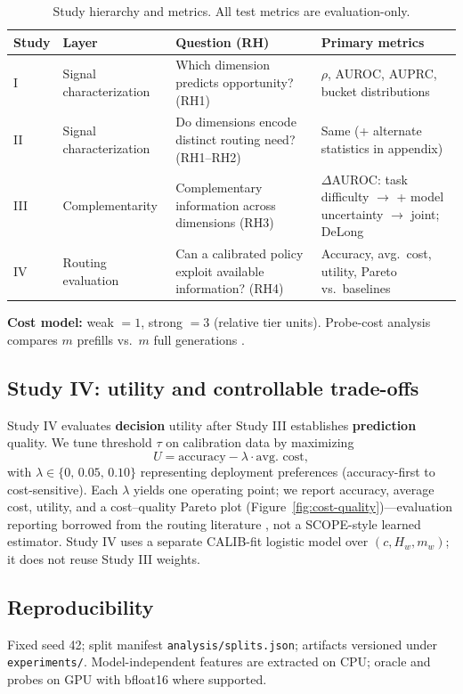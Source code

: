 \begin{table}[t]
  \centering
  \small
  \begin{tabular}{llll}
    \toprule
    \textbf{Study} & \textbf{Layer} & \textbf{Question (RH)} & \textbf{Primary metrics} \\
    \midrule
    I  & Signal characterization & Which dimension predicts opportunity? (RH1) &
      $\rho$, AUROC, AUPRC, bucket distributions \\
    II & Signal characterization & Do dimensions encode distinct routing need? (RH1--RH2) &
      Same (+ alternate statistics in appendix) \\
    III & Complementarity & Complementary information across dimensions (RH3) &
      $\Delta$AUROC: task difficulty $\rightarrow$ + model uncertainty $\rightarrow$ joint; DeLong \\
    IV & Routing evaluation & Can a calibrated policy exploit available information? (RH4) &
      Accuracy, avg.\ cost, utility, Pareto vs.\ baselines \\
    \bottomrule
  \end{tabular}
  \caption{Study hierarchy and metrics. All test metrics are evaluation-only.}
  \label{tab:metrics}
\end{table}

\textbf{Cost model:} weak $=1$, strong $=3$ (relative tier units).
Probe-cost analysis compares $m$ prefills vs.\ $m$ full generations \citep{guha2024smoothie,kotte2026ucci}.

\subsection{Study IV: utility and controllable trade-offs}
\label{sec:setup:utility}

Study IV evaluates \textbf{decision} utility after Study III establishes \textbf{prediction} quality.
We tune threshold $\tau$ on calibration data by maximizing
\begin{equation}
U = \text{accuracy} - \lambda \cdot \text{avg.\ cost},
\end{equation}
with $\lambda \in \{0,\,0.05,\,0.10\}$ representing deployment preferences (accuracy-first to cost-sensitive).
Each $\lambda$ yields one operating point; we report accuracy, average cost, utility, and a cost--quality Pareto plot (Figure~\ref{fig:cost-quality})---evaluation reporting borrowed from the routing literature \citep{hu2024routerbench,cao2026scope}, not a SCOPE-style learned estimator.
Study IV uses a separate CALIB-fit logistic model over $(c, H_w, m_w)$; it does not reuse Study III weights.

\subsection{Reproducibility}
\label{sec:setup:repro}

Fixed seed 42; split manifest \texttt{analysis/splits.json}; artifacts versioned under \texttt{experiments/}.
Model-independent features are extracted on CPU; oracle and probes on GPU with bfloat16 where supported.
